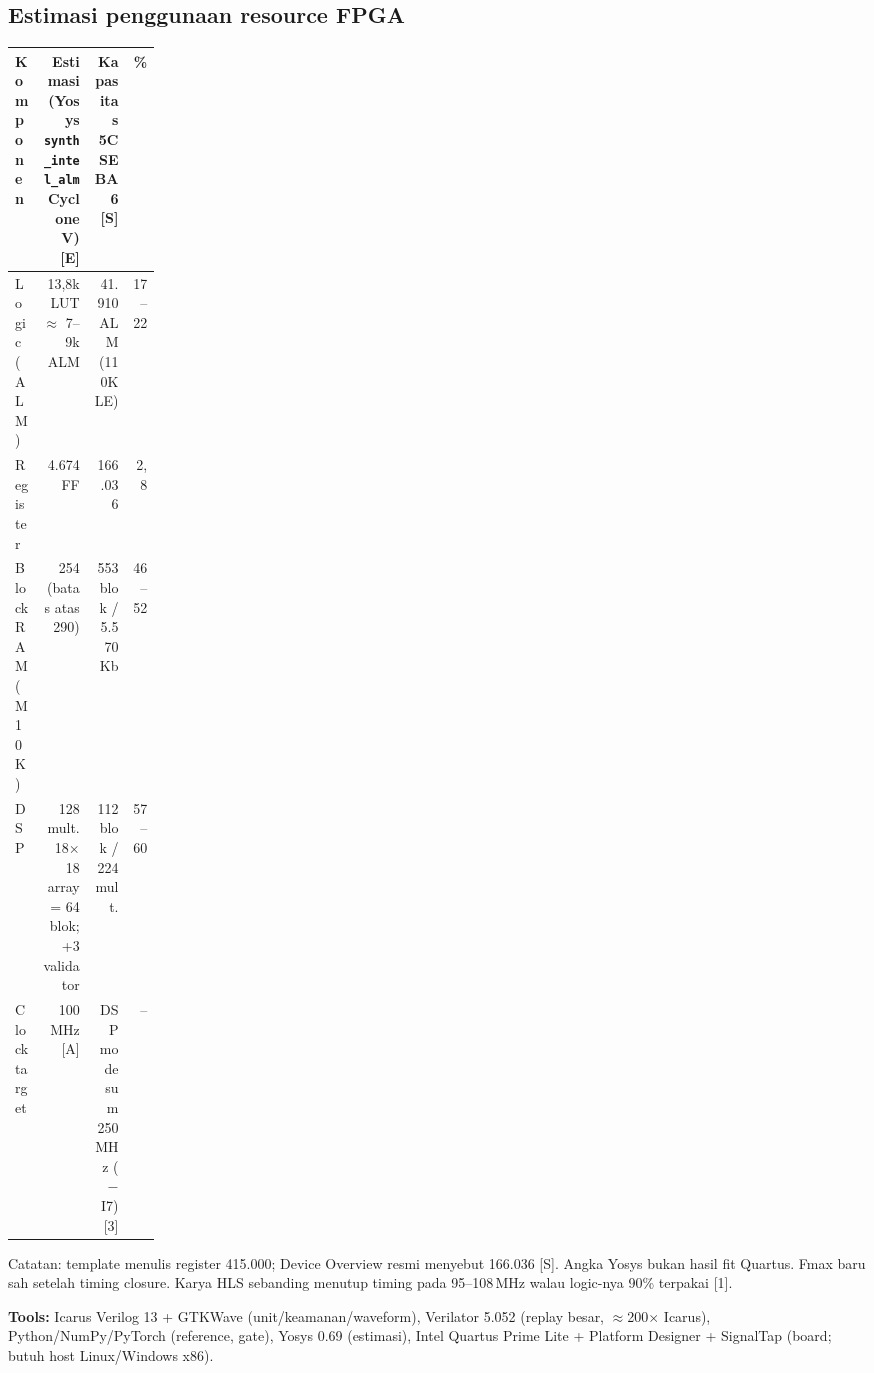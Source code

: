 \documentclass[9pt]{extarticle}
\newcommand{\hd}[1]{\cellcolor{thbg}\textbf{#1}}
\begin{document}
\subsection{Estimasi penggunaan resource FPGA}
{\scriptsize
\begin{tabularx}{\linewidth}{|p{0.17\linewidth}|R|R|r|}
\hline
\hd{Komponen} & \hd{Estimasi (Yosys \texttt{synth\_intel\_alm} Cyclone V) [E]} & \hd{Kapasitas 5CSEBA6 [S]} & \hd{\%} \\ \hline
Logic (ALM) & 13,8k LUT $\approx$ 7--9k ALM & 41.910 ALM (110K LE) & 17--22 \\ \hline
Register & 4.674 FF & 166.036 & 2,8 \\ \hline
Block RAM (M10K) & 254 (batas atas 290) & 553 blok / 5.570 Kb & 46--52 \\ \hline
DSP & 128 mult. 18$\times$18 array = 64 blok; +3 validator & 112 blok / 224 mult. & 57--60 \\ \hline
Clock target & 100 MHz [A] & DSP mode sum 250 MHz ($-$I7) [3] & -- \\ \hline
\end{tabularx}

Catatan: template menulis register 415.000; Device Overview resmi menyebut 166.036 [S]. Angka Yosys bukan hasil fit Quartus. Fmax baru sah setelah timing closure. Karya HLS sebanding menutup timing pada 95--108\,MHz walau logic-nya 90\% terpakai [1].

\textbf{Tools:} Icarus Verilog 13 + GTKWave (unit/keamanan/waveform), Verilator 5.052 (replay besar, $\approx$200$\times$ Icarus), Python/NumPy/PyTorch (reference, gate), Yosys 0.69 (estimasi), Intel Quartus Prime Lite + Platform Designer + SignalTap (board; butuh host Linux/Windows x86).}
\end{document}
